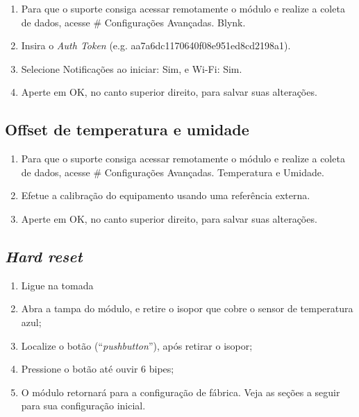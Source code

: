 \begin{enumerate}
    \item
    Para que o suporte consiga acessar remotamente o módulo e realize a coleta de dados, acesse \# \textrightarrow{} Configurações Avançadas.\textrightarrow{} Blynk.

    \item
    Insira o \emph{Auth Token} (e.g. aa7a6dc1170640f08e951ed8cd2198a1).

    \item
    Selecione Notificações ao iniciar: Sim, e Wi-Fi: Sim.

    \item
    Aperte em OK, no canto superior direito, para salvar suas alterações.
\end{enumerate}

\subsection{Offset de temperatura e umidade}

\begin{enumerate}
    \item
    Para que o suporte consiga acessar remotamente o módulo e realize a coleta de dados, acesse \# \textrightarrow{} Configurações Avançadas.\textrightarrow{} Temperatura e Umidade.

    \item
    Efetue a calibração do equipamento usando uma referência externa.

    \item
    Aperte em OK, no canto superior direito, para salvar suas alterações.
\end{enumerate}

\subsection{\emph{Hard reset}}
\begin{enumerate}
	\item Ligue na tomada
	\item Abra a tampa do módulo, e retire o isopor que cobre o sensor de temperatura azul;
	\item Localize o botão (“\emph{pushbutton}”), após retirar o isopor;
	\item Pressione o botão até ouvir 6 bipes;
	\item O módulo retornará para a configuração de fábrica. Veja as seções a seguir para sua configuração inicial.
\end{enumerate}

